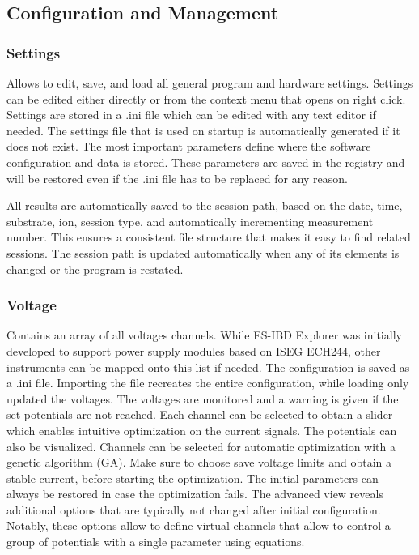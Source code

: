 \documentclass[a4paper,11pt,DIV=13]{scrartcl}
\begin{document}
\subsection{Configuration and Management}

\subsubsection{Settings}
Allows to edit, save, and load all general program and hardware settings. 
Settings can be edited either directly or from the context menu that opens on right click.
Settings are stored in a .ini file which can be edited with any text editor if needed.
The settings file that is used on startup is automatically generated if it does not exist.
The most important parameters define where the software configuration and data is stored. 
These parameters are saved in the registry and will be restored even if the .ini file has to be replaced for any reason.

All results are automatically saved to the session path, based on the date, time, substrate, ion, session type, and automatically incrementing measurement number.
This ensures a consistent file structure that makes it easy to find related sessions. 
The session path is updated automatically when any of its elements is changed or the program is restated. 

\subsubsection{Voltage}
Contains an array of all voltages channels. While ES-IBD Explorer was initially developed to support power supply modules based on ISEG ECH244, other instruments can be mapped onto this list if needed. The configuration is saved as a .ini file. Importing the file recreates the entire configuration, while loading only updated the voltages. The voltages are monitored and a warning is given if the set potentials are not reached. Each channel can be selected to obtain a slider which enables intuitive optimization on the current signals. The potentials can also be visualized. Channels can be selected for automatic optimization with a genetic algorithm (GA). Make sure to choose save voltage limits and obtain a stable current, before starting the optimization. The initial parameters can always be restored in case the optimization fails. The advanced view reveals additional options that are typically not changed after initial configuration. Notably, these options allow to define virtual channels that allow to control a group of potentials with a single parameter using equations.
\end{document}
